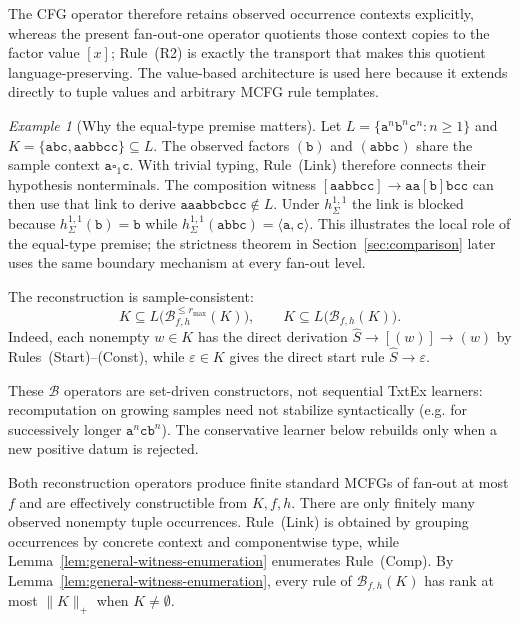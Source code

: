 \documentclass[11pt]{article}
\numberwithin{equation}{section}
\theoremstyle{plain}
\theoremstyle{definition}
\theoremstyle{remark}
\newtheorem{example}[theorem]{Example}
\newcommand{\blank}{\square}
\newcommand{\eps}{\varepsilon}
\begin{document}
The CFG operator therefore retains observed occurrence contexts explicitly,
whereas the present fan-out-one operator quotients those context copies to the
factor value $[x]$; Rule~(R2) is exactly the transport that makes this quotient
language-preserving.  The value-based architecture is used here because it
extends directly to tuple values and arbitrary MCFG rule templates.

\begin{example}[Why the equal-type premise matters]
\label{ex:type-guard-purpose}
Let $L=\{\mathtt a^n\mathtt b^n\mathtt c^n:n\ge1\}$ and
$K=\{\mathtt{abc},\mathtt{aabbcc}\}\subseteq L$.  The observed factors
$(\mathtt b)$ and $(\mathtt{abbc})$ share the sample context
$\mathtt a\blank_1\mathtt c$.  With trivial typing, Rule~(Link) therefore
connects their hypothesis nonterminals.  The composition witness
$[\mathtt{aabbcc}]\to\mathtt{aa}[\mathtt b]\mathtt{bcc}$ can then use that
link to derive $\mathtt{aaabbcbcc}\notin L$.  Under $h_\Sigma^{1,1}$ the
link is blocked because $h_\Sigma^{1,1}(\mathtt b)=\mathtt b$ while
$h_\Sigma^{1,1}(\mathtt{abbc})=\langle\mathtt a,\mathtt c\rangle$.
This illustrates the local role of the equal-type premise; the strictness theorem in
Section~\ref{sec:comparison} later uses the same boundary mechanism at every
fan-out level.
\end{example}

The reconstruction is sample-consistent:
\[
 K\subseteq L\bigl(\mathcal B_{f,h}^{\le r_{\max}}(K)\bigr),
 \qquad
 K\subseteq L\bigl(\mathcal B_{f,h}(K)\bigr).
\]
Indeed, each nonempty $w\in K$ has the direct derivation
$\widehat S\to[(w)]\to(w)$ by Rules~(Start)--(Const), while
$\eps\in K$ gives the direct start rule $\widehat S\to\eps$.

These $\mathcal B$ operators are set-driven constructors, not sequential TxtEx
learners: recomputation on growing samples need not stabilize syntactically
(e.g. for successively longer $\mathtt a^n\mathtt c\mathtt b^n$).  The conservative learner below
rebuilds only when a new positive datum is rejected.

Both reconstruction operators produce finite standard MCFGs of fan-out at
most $f$ and are effectively constructible from $K,f,h$.  There are only
finitely many observed nonempty tuple occurrences.  Rule~(Link) is obtained by
grouping occurrences by concrete context and componentwise type, while
Lemma~\ref{lem:general-witness-enumeration} enumerates Rule~(Comp).  By
Lemma~\ref{lem:general-witness-enumeration}, every rule of $\mathcal B_{f,h}(K)$
has rank at most $\|K\|_+$ when $K\ne\emptyset$.
\end{document}
